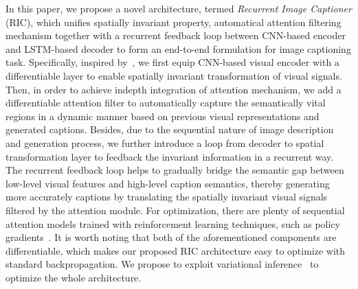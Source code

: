 \documentclass[10pt,twocolumn,letterpaper]{article}
\begin{document}
	In this paper, we propose a novel architecture, termed \emph{Recurrent Image Captioner} (RIC), which unifies spatially invariant property, automatical attention filtering mechanism together with a recurrent feedback loop between CNN-based encoder and LSTM-based decoder to form an end-to-end formulation for image captioning task. Specifically, inspired by~\cite{jaderberg2015spatial}, we first equip CNN-based visual encoder with a differentiable layer to enable spatially invariant transformation of visual signals. Then, in order to achieve indepth integration of attention mechanism, we add a differentiable attention filter to automatically capture the semantically vital regions in a dynamic manner based on previous visual representations and generated captions. Besides, due to the sequential nature of image description and generation process, we further introduce a loop from decoder to spatial transformation layer to feedback the invariant information in a recurrent way. The recurrent feedback loop helps to gradually bridge the semantic gap between low-level visual features and high-level caption semantics, thereby generating more accurately captions by translating the spatially invariant visual signals filtered by the attention module. For optimization, there are plenty of sequential attention models trained with reinforcement learning techniques, such as policy gradients~\cite{mnih2014recurrent}. It is worth noting that both of the aforementioned components are differentiable, which makes our proposed RIC architecture easy to optimize with standard backpropagation. We propose to exploit variational inference~\cite{frigola2014variational} to optimize the whole architecture.
	
	
\end{document}
